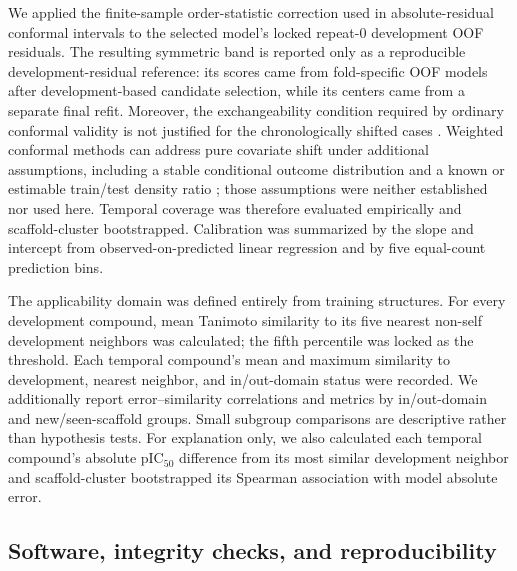 \documentclass[11pt]{article}
\begin{document}
We applied the finite-sample order-statistic correction used in absolute-residual
conformal intervals to the selected model's locked repeat-0 development OOF
residuals. The resulting symmetric band is reported only as a reproducible
development-residual reference: its scores came from fold-specific OOF models
after development-based candidate selection, while its centers came from a
separate final refit. Moreover, the exchangeability condition required by
ordinary conformal validity is not justified for the chronologically shifted
cases \citep{barber2023beyond}. Weighted conformal methods can address pure
covariate shift under additional assumptions, including a stable conditional
outcome distribution and a known or estimable train/test density ratio
\citep{tibshirani2019covariate}; those assumptions were neither established nor
used here. Temporal coverage was therefore evaluated empirically and
scaffold-cluster bootstrapped. Calibration was summarized by the slope and
intercept from observed-on-predicted linear regression and by five equal-count
prediction bins.

The applicability domain was defined entirely from training structures. For every
development compound, mean Tanimoto similarity to its five nearest non-self
development neighbors was calculated; the fifth percentile was locked as the
threshold. Each temporal compound's mean and maximum similarity to development,
nearest neighbor, and in/out-domain status were recorded. We additionally report
error--similarity correlations and metrics by in/out-domain and new/seen-scaffold
groups. Small subgroup comparisons are descriptive rather than hypothesis tests.
For explanation only, we also calculated each temporal compound's absolute
pIC$_{50}$ difference from its most similar development neighbor and
scaffold-cluster bootstrapped its Spearman association with model absolute error.

\subsection{Software, integrity checks, and reproducibility}
\end{document}
